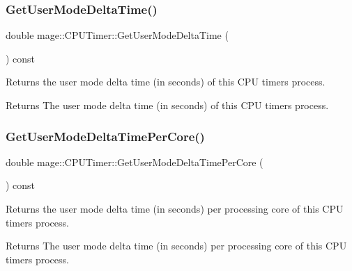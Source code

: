\subsubsection{\texorpdfstring{Get\+User\+Mode\+Delta\+Time()}{GetUserModeDeltaTime()}}
{\footnotesize\ttfamily double mage\+::\+C\+P\+U\+Timer\+::\+Get\+User\+Mode\+Delta\+Time (\begin{DoxyParamCaption}{ }\end{DoxyParamCaption}) const\hspace{0.3cm}{\ttfamily [noexcept]}}

Returns the user mode delta time (in seconds) of this C\+PU timer\textquotesingle{}s process.

\begin{DoxyReturn}{Returns}
The user mode delta time (in seconds) of this C\+PU timer\textquotesingle{}s process. 
\end{DoxyReturn}
\hypertarget{classmage_1_1_c_p_u_timer_a3ce491aca668067476465b4ab56f4809}{}\label{classmage_1_1_c_p_u_timer_a3ce491aca668067476465b4ab56f4809} 
\subsubsection{\texorpdfstring{Get\+User\+Mode\+Delta\+Time\+Per\+Core()}{GetUserModeDeltaTimePerCore()}}
{\footnotesize\ttfamily double mage\+::\+C\+P\+U\+Timer\+::\+Get\+User\+Mode\+Delta\+Time\+Per\+Core (\begin{DoxyParamCaption}{ }\end{DoxyParamCaption}) const\hspace{0.3cm}{\ttfamily [noexcept]}}

Returns the user mode delta time (in seconds) per processing core of this C\+PU timer\textquotesingle{}s process.

\begin{DoxyReturn}{Returns}
The user mode delta time (in seconds) per processing core of this C\+PU timer\textquotesingle{}s process. 
\end{DoxyReturn}
\hypertarget{classmage_1_1_c_p_u_timer_aa453ec0f437762bff5c33ea344329d10}{}\label{classmage_1_1_c_p_u_timer_aa453ec0f437762bff5c33ea344329d10} 
